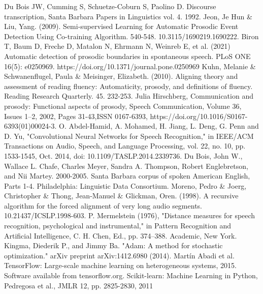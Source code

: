 \documentclass[conference]{IEEEtran}
\begin{document}
\begin{thebibliography}{00}
 Du Bois JW, Cumming S, Schuetze-Coburn S, Paolino D. Discourse transcription, Santa Barbara Papers in Linguistics vol. 4. 1992.
 Jeon, Je Hun \& Liu, Yang. (2009). Semi-supervised Learning for Automatic Prosodic Event Detection Using Co-training Algorithm. 540-548. 10.3115/1690219.1690222.
 Biron T, Baum D, Freche D, Matalon N, Ehrmann N, Weinreb E, et al. (2021) Automatic detection of prosodic boundaries in spontaneous speech. PLoS ONE 16(5): e0250969. https://doi.org/10.1371/journal.pone.0250969
 Kuhn, Melanie \& Schwanenflugel, Paula \& Meisinger, Elizabeth. (2010). Aligning theory and assessment of reading fluency: Automaticity, prosody, and definitions of fluency. Reading Research Quarterly. 45. 232-253.
 Julia Hirschberg, Communication and prosody: Functional aspects of prosody, Speech Communication, Volume 36, Issues 1–2, 2002, Pages 31-43,ISSN 0167-6393, https://doi.org/10.1016/S0167-6393(01)00024-3.
 O. Abdel-Hamid, A. Mohamed, H. Jiang, L. Deng, G. Penn and D. Yu, "Convolutional Neural Networks for Speech Recognition," in IEEE/ACM Transactions on Audio, Speech, and Language Processing, vol. 22, no. 10, pp. 1533-1545, Oct. 2014, doi: 10.1109/TASLP.2014.2339736.
 Du Bois, John W., Wallace L. Chafe, Charles Meyer, Sandra A. Thompson, Robert Englebretson, and Nii Martey. 2000-2005. Santa Barbara corpus of spoken American English, Parts 1-4. Philadelphia: Linguistic Data Consortium.
 Moreno, Pedro \& Joerg, Christopher \& Thong, Jean-Manuel \& Glickman, Oren. (1998). A recursive algorithm for the forced alignment of very long audio segments. 10.21437/ICSLP.1998-603.
 P. Mermelstein (1976), "Distance measures for speech recognition, psychological and instrumental," in Pattern Recognition and Artificial Intelligence, C. H. Chen, Ed., pp. 374–388. Academic, New York.
 Kingma, Diederik P., and Jimmy Ba. "Adam: A method for stochastic optimization." arXiv preprint arXiv:1412.6980 (2014).
 Martín Abadi et al. TensorFlow: Large-scale machine learning on heterogeneous systems, 2015. Software available from tensorflow.org.
Scikit-learn: Machine Learning in Python, Pedregosa et al., JMLR 12, pp. 2825-2830, 2011
\end{thebibliography}
\end{document}

